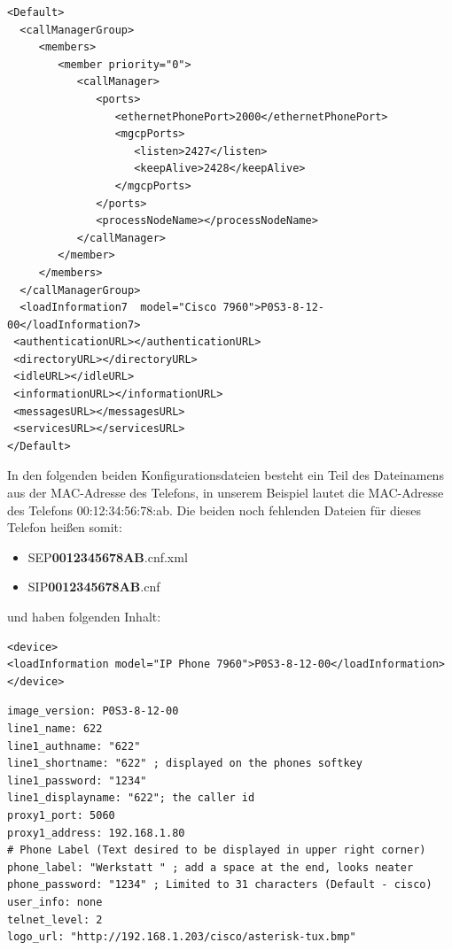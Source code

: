 \documentclass[a4paper,12pt]{scrbook}
\begin{document}
\begin{lstlisting}[caption={XMLDefault.cnf.xml},label=lst:7960sipdefaultcnf]
<Default>
  <callManagerGroup>
     <members>
        <member priority="0">
           <callManager>
              <ports>
                 <ethernetPhonePort>2000</ethernetPhonePort>
                 <mgcpPorts>
                    <listen>2427</listen>
                    <keepAlive>2428</keepAlive>
                 </mgcpPorts>
              </ports>
              <processNodeName></processNodeName>
           </callManager>
        </member>
     </members>
  </callManagerGroup>
  <loadInformation7  model="Cisco 7960">P0S3-8-12-00</loadInformation7>
 <authenticationURL></authenticationURL>
 <directoryURL></directoryURL>
 <idleURL></idleURL>
 <informationURL></informationURL>
 <messagesURL></messagesURL>
 <servicesURL></servicesURL>
</Default>
\end{lstlisting}

In den folgenden beiden Konfigurationsdateien besteht ein Teil des Dateinamens aus der MAC-Adresse des Telefons, in unserem Beispiel lautet die MAC-Adresse des Telefons 00:12:34:56:78:ab.
Die beiden noch fehlenden Dateien für dieses Telefon heißen somit:
\begin{itemize}
 \item SEP\textbf{0012345678AB}.cnf.xml
 \item SIP\textbf{0012345678AB}.cnf
\end{itemize}
und haben folgenden Inhalt:

\begin{lstlisting}[caption={SEP0012345678AB.cnf.xml},label=lst:7960sep0012345678abcnfxml]
<device>
<loadInformation model="IP Phone 7960">P0S3-8-12-00</loadInformation>
</device>
\end{lstlisting}

\begin{lstlisting}[caption={SIP0012345678AB.cnf},label=lst:7960sip0012345678abcnf]
image_version: P0S3-8-12-00
line1_name: 622
line1_authname: "622"
line1_shortname: "622" ; displayed on the phones softkey
line1_password: "1234"
line1_displayname: "622"; the caller id
proxy1_port: 5060
proxy1_address: 192.168.1.80
# Phone Label (Text desired to be displayed in upper right corner)
phone_label: "Werkstatt " ; add a space at the end, looks neater
phone_password: "1234" ; Limited to 31 characters (Default - cisco)
user_info: none
telnet_level: 2
logo_url: "http://192.168.1.203/cisco/asterisk-tux.bmp"
\end{lstlisting}
\end{document}
